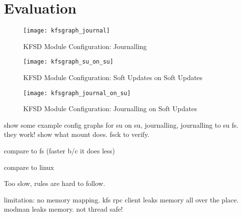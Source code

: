 \section{Evaluation}
\label{sec:eval}

\newcommand{\kfsgraphscale}{0.3}

\begin{figure}[htb]
\begin{center}
  \texttt{[image: kfsgraph\_journal]}
  \label{fig:kfsgraph-journal}
  \caption{KFSD Module Configuration: Journalling}
\end{center}
\end{figure}

\begin{figure}[htb]
\begin{center}
  \texttt{[image: kfsgraph\_su\_on\_su]}
  \label{fig:kfsgraph-su-on-su}
  \caption{KFSD Module Configuration: Soft Updates on Soft Updates}
\end{center}
\end{figure}

\begin{figure}[htb]
\begin{center}
  \texttt{[image: kfsgraph\_journal\_on\_su]}
  \label{fig:kfsgraph-journal-on-su}
  \caption{KFSD Module Configuration: Journalling on Soft Updates}
\end{center}
\end{figure}

show some example config graphs for su on su, journalling, journalling
to su fs. they work! show what mount does. fsck to verify.

compare to fs (faster b/c it does less)

compare to linux

Too slow, rules are hard to follow.

limitation: no memory mapping. kfs rpc client leaks memory all over
the place. modman leaks memory. not thread safe!
